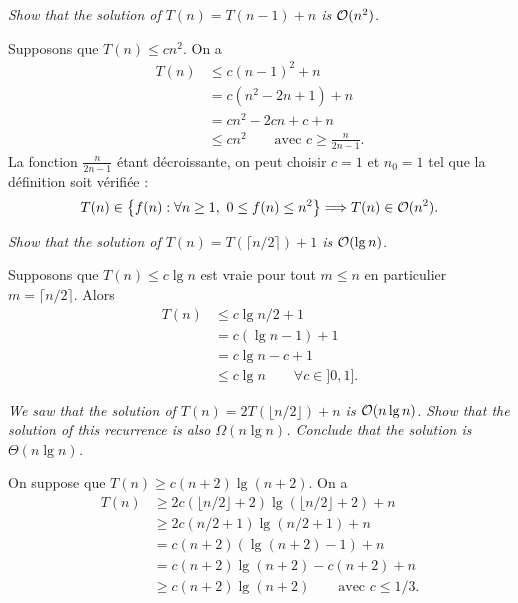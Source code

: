 \begin{description}
   {\itshape Show that the solution of $T(n) = T(n-1) + n$ is $\mathcal{O}(n^2)$.}

    \begin{ex}
      Supposons que $T(n) \le cn^2$. On a 
      \begin{align*}
        T(n) &\le c(n-1)^2 + n\\
        &= c(n^2-2n+1)+n\\
        &= cn^2 - 2cn + c + n\\
        &\le cn^2 \quad\quad \textrm{avec }c \ge \frac{n}{2n-1}.
      \end{align*}
      La fonction $\frac{n}{2n-1}$ étant décroissante, on peut choisir $c = 1$ et $n_0 = 1$ tel que la définition soit vérifiée : 
      \begin{align*}
        T(n) \in \left\{ f(n) : \forall n \ge 1,~ 0 \le f(n) \le n^2 \right\}  \Longrightarrow T(n) \in \mathcal{O}(n^2).
      \end{align*}

    \end{ex}

   {\itshape Show that the solution of $T(n) = T(\lceil n/2 \rceil)+1$ is $\mathcal{O}(\lg n)$.}

    \begin{ex}
      Supposons que $T(n) \le c\lg n$ est vraie pour tout $m \le n$ en particulier ${m = \lceil n/2 \rceil}$. Alors 
      \begin{align*}
        T(n) &\le c\lg n/2 + 1\\
        &= c(\lg n - 1) + 1\\
        &= c \lg n -c + 1\\
        &\le c\lg n \quad\quad \forall c \in ]0, 1].
      \end{align*}
    \end{ex}

   {\itshape We saw that the solution of $T(n) = 2T(\lfloor n/2 \rfloor) + n$ is $\mathcal{O}(n \lg n)$. Show that the solution of this recurrence is also $\Omega(n \lg n)$. Conclude that the solution is $\Theta(n \lg n)$.}
  \begin{ex} %
    On suppose que $T(n) \ge c(n+2)\lg(n+2)$. On a 
    \begin{align*}
      T(n) &\ge 2c(\lfloor n/2\rfloor+2)\lg(\lfloor n/2\rfloor+2) + n\\
        &\ge 2c(n/2+1)\lg(n/2+1)+n \\
        &= c(n+2)(\lg(n+2)-1)+n\\
        &= c(n+2)\lg(n+2)-c(n+2)+n\\
        &\ge c(n+2)\lg(n+2) \quad\quad \textrm{avec } c \le 1/3. 
    \end{align*}


\end{ex}
\end{description}
